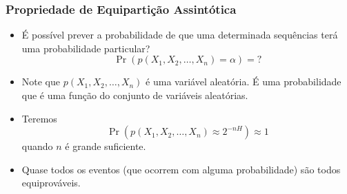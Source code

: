 \begin{frame}%
  \frametitle{Propriedade de Equipartição Assintótica}
  \begin{itemize}
  \item É possível prever a probabilidade de que uma determinada sequências terá uma probabilidade particular?
        \begin{equation}
        \Pr(p(X_1,X_2,\ldots,X_n)=\alpha) = ?
        \end{equation}
  \item Note que $p(X_1,X_2,\ldots,X_n)$ é uma variável aleatória. É uma probabilidade que é uma função
        do conjunto de variáveis aleatórias.
  \item Teremos
        \begin{equation}
        \Pr(p(X_1,X_2,\ldots,X_n) \approx 2^{-nH} ) \approx 1
        \end{equation}
        quando $n$ é grande suficiente.
  \item Quase todos os eventos (que ocorrem com alguma probabilidade) são todos equiprováveis.
  \end{itemize}
\end{frame}

